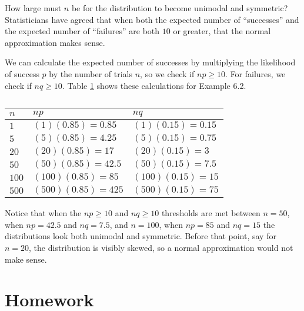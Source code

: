 How large must \(n\) be for the distribution to become unimodal and symmetric? Statisticians have agreed that when both the expected number of ``successes'' and the expected number of ``failures'' are both \(10\) or greater, that the normal approximation makes sense. 

We can calculate the expected number of successes by multiplying the likelihood of success \(p\) by the number of trials \(n\), so we check if \(np \geq 10\). For failures, we check if \(nq \geq 10\). Table \ref{tab:B(500,n)} shows these calculations for Example 6.2.

\begin{table}[b]
\centering
\begin{tabular}{lll}
\(n\) &  \(np\) & \(nq\) \\ \hline
\(1  \) & \((1)(0.85)   = 0.85\) & \((1)(0.15) =  0.15\) \\
\(5  \) & \((5)(0.85)   = 4.25\) & \((5)(0.15) =  0.75\) \\
\(20 \) & \((20)(0.85)  = 17  \) & \((20)(0.15) = 3\)  \\
\(50 \) & \((50)(0.85)  = 42.5\) & \((50)(0.15) =  7.5\) \\
\(100\) & \((100)(0.85) = 85  \) & \((100)(0.15) =  15\) \\
\(500\) & \((500)(0.85) = 425 \) & \((500)(0.15) =  75\) 
\end{tabular}
\caption{}
\label{tab:B(500,n)}
\end{table}

Notice that when the \(np \geq 10\) and \(nq \geq 10\) thresholds are met between \(n=50\), when \(np =42.5\) and \(nq= 7.5\), and \(n=100\), when \(np=85\) and \(nq=15\) the distributions look both unimodal and symmetric. Before that point, say for \(n = 20\), the distribution is visibly skewed, so a normal approximation would not make sense.


\section{Homework}

